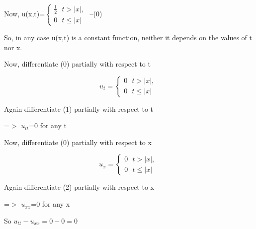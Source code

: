 \documentclass{article}
\begin{document}
Now, u(x,t)=$\left\{\begin{array}{l}\frac{1}{2}\ \ \
t>\left\vert{}x\right\vert{}, \\
0\ \ \ t\leq{}\left\vert{}x\right\vert{}\end{array}\right.$ --(0)

So, in any case u(x,t) is a constant function, neither it depends on the values
of t nor x.

Now, differentiate (0) partially with respect to t


\begin{equation}
u_t=\left\{\begin{array}{l}0\ \ \ t>\left\vert{}x\right\vert{}, \\
0\ \ \ t\leq{}\left\vert{}x\right\vert{}\end{array}\right.\
\end{equation}

Again differentiate (1) partially with respect to t

=$>$ $u_{tt}$=0 for any t

Now, differentiate (0) partially with respect to x



\begin{equation}
u_x=\left\{\begin{array}{l}0\ \ \ t>\left\vert{}x\right\vert{}, \\
0\ \ \ t\leq{}\left\vert{}x\right\vert{}\end{array}\right.\
\end{equation}

Again differentiate (2) partially with respect to x

=$>$ $u_{xx}$=0 for any x

So $u_{tt}-u_{xx}=0-0=0$
\end{document}
